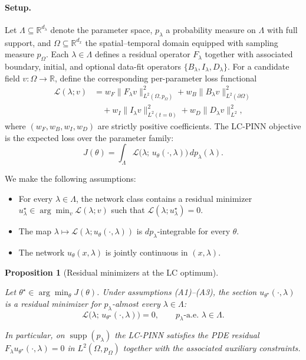 \documentclass{article}
\theoremstyle{plain}
\newtheorem{proposition}[theorem]{Proposition}
\theoremstyle{definition}
\theoremstyle{remark}
\begin{document}
\paragraph{Setup.}
Let $\Lambda \subseteq \mathbb{R}^{d_\lambda}$ denote the parameter
space, $p_\lambda$ a probability measure on $\Lambda$ with full
support, and $\Omega \subseteq \mathbb{R}^{d_x}$ the
spatial--temporal domain equipped with sampling measure $p_\Omega$.
Each $\lambda \in \Lambda$ defines a residual operator $F_\lambda$
together with associated boundary, initial, and optional data-fit
operators
$\{B_\lambda, I_\lambda, D_\lambda\}$. For a candidate field
$v : \Omega \to \mathbb{R}$, define the corresponding per-parameter
loss functional
\[
\begin{aligned}
   \mathcal{L}(\lambda; v)
   &=
     w_F \|F_\lambda v\|_{L^2(\Omega,p_\Omega)}^2
     + w_B \|B_\lambda v\|_{L^2(\partial\Omega)}^2 \\
   &\quad
     + w_I \|I_\lambda v\|_{L^2(t=0)}^2
     + w_D \|D_\lambda v\|_{L^2}^2 ,
\end{aligned}
\]
where $(w_F,w_B,w_I,w_D)$ are strictly positive coefficients. The
LC-PINN objective is the expected loss over the parameter family:
\[
   J(\theta)
   =
   \int_\Lambda
      \mathcal{L}\bigl(
          \lambda;\,
          u_\theta(\cdot,\lambda)
      \bigr)
   \,dp_\lambda(\lambda).
\]

We make the following assumptions:
\begin{itemize}\setlength{\itemsep}{0pt}
   \item[(A1)] For every $\lambda \in \Lambda$, the network class
         contains a residual minimizer
         $u^\star_\lambda \in \arg\min_v \mathcal{L}(\lambda;v)$ such
         that
         $\mathcal{L}(\lambda;u^\star_\lambda)=0$.

   \item[(A2)] The map
         $\lambda \mapsto
         \mathcal{L}(\lambda;u_\theta(\cdot,\lambda))$
         is $dp_\lambda$-integrable for every $\theta$.

   \item[(A3)] The network $u_\theta(x,\lambda)$ is jointly continuous
         in $(x,\lambda)$.
\end{itemize}

\begin{proposition}[Residual minimizers at the LC optimum]
\label{prop:lc-invariance}

Let $\theta^\star \in \arg\min_\theta J(\theta)$. Under assumptions
\textnormal{(A1)--(A3)}, the section
$u_{\theta^\star}(\cdot,\lambda)$ is a residual minimizer for
$p_\lambda$-almost every $\lambda \in \Lambda$:
\[
   \mathcal{L}\bigl(
      \lambda;\,
      u_{\theta^\star}(\cdot,\lambda)
   \bigr)
   =
   0,
   \qquad
   p_\lambda\text{-a.e. } \lambda \in \Lambda .
\]

In particular, on $\operatorname{supp}(p_\lambda)$ the LC-PINN
satisfies the PDE residual
$F_\lambda u_{\theta^\star}(\cdot,\lambda)=0$ in
$L^2(\Omega,p_\Omega)$ together with the associated auxiliary
constraints.
\end{proposition}
\end{document}
